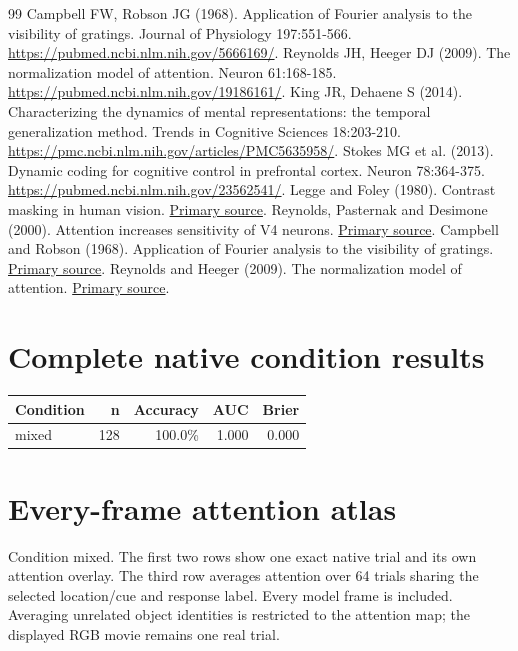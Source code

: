 \documentclass[11pt]{article}
\begin{document}
\begin{thebibliography}{99}
 Campbell FW, Robson JG (1968). Application of Fourier analysis to the visibility of gratings. Journal of Physiology 197:551-566. \url{https://pubmed.ncbi.nlm.nih.gov/5666169/}.
 Reynolds JH, Heeger DJ (2009). The normalization model of attention. Neuron 61:168-185. \url{https://pubmed.ncbi.nlm.nih.gov/19186161/}.
 King JR, Dehaene S (2014). Characterizing the dynamics of mental representations: the temporal generalization method. Trends in Cognitive Sciences 18:203-210. \url{https://pmc.ncbi.nlm.nih.gov/articles/PMC5635958/}.
 Stokes MG et al. (2013). Dynamic coding for cognitive control in prefrontal cortex. Neuron 78:364-375. \url{https://pubmed.ncbi.nlm.nih.gov/23562541/}.
 Legge and Foley (1980). Contrast masking in human vision. \href{https://pubmed.ncbi.nlm.nih.gov/7463185/}{Primary source}.
 Reynolds, Pasternak and Desimone (2000). Attention increases sensitivity of V4 neurons. \href{https://pubmed.ncbi.nlm.nih.gov/10896165/}{Primary source}.
 Campbell and Robson (1968). Application of Fourier analysis to the visibility of gratings. \href{https://doi.org/10.1113/jphysiol.1968.sp008574}{Primary source}.
 Reynolds and Heeger (2009). The normalization model of attention. \href{https://pmc.ncbi.nlm.nih.gov/articles/PMC2752446/}{Primary source}.
\end{thebibliography}\clearpage\appendix\section{Complete native condition results}
\small\begin{longtable}{p{}rrrr}\toprule Condition & n & Accuracy & AUC & Brier\\\midrule\endhead
mixed & 128 & 100.0\% & 1.000 & 0.000\\
\bottomrule\end{longtable}\normalsize\section{Every-frame attention atlas}
Condition mixed. The first two rows show one exact native trial and its own attention overlay. The third row averages attention over 64 trials sharing the selected location/cue and response label. Every model frame is included. Averaging unrelated object identities is restricted to the attention map; the displayed RGB movie remains one real trial.
\end{document}

